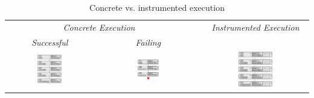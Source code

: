\begin{table}[t!]
\centering 
{\scriptsize \begin{tabular}{@{}c@{}ccc@{}c@{}}\toprule
\multicolumn{3}{c}{{\it Concrete Execution}} & &  \emph{Instrumented Execution}  \\
\cmidrule{1-3} \cmidrule{5-5}
\emph{Successful}  &  & \emph{Failing}  &   &       \\
\cmidrule{1-1} \cmidrule{3-3}   
{\includegraphics[width=0.30\textwidth,valign=T]{figures/conc_exec.png}} & & 
{\includegraphics[width=0.26\textwidth,valign=T]{figures/conc_wrong_exec.png}} & & 
{\includegraphics[width=0.342\textwidth,valign=T]{figures/inst_exec.png}}  \\  
\bottomrule
\end{tabular}}
\vspace{2pt}
\caption{Concrete vs. instrumented execution\label{example:symb:states:vs:assertions}}
\vspace*{-0.9cm}
\end{table}

